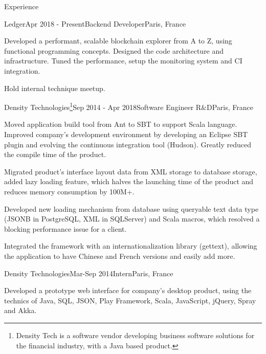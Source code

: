\documentclass{resume} %
\begin{document}

\begin{rSection}{Experience}

  \begin{rSubsection}{Ledger}{Apr 2018 - Present}{Backend Developer}{Paris, France}
  \item Developed a performant, scalable blockchain explorer from A to Z, using
    functional programming concepts. Designed the code architecture and
    infrastructure. Tuned the performance, setup the monitoring system and CI
    integration.
  \item Hold internal technique meetup.
  \end{rSubsection}

  \begin{rSubsection}{Density Technologies\footnote{Density Tech is a software
        vendor developing business software solutions for the financial industry,
        with a Java based product.}}{Sep 2014 - Apr 2018}{Software Engineer
      R\&D}{Paris, France}
  \item Moved application build tool from Ant to SBT to support Scala language.
    Improved company's development environment by developing an Eclipse SBT
    plugin and evolving the continuous integration tool (Hudson). Greatly
    reduced the compile time of the product.
  \item Migrated product's interface layout data from XML storage to database
    storage, added lazy loading feature, which halves the launching time of the
    product and reduces memory consumption by 100M+.
  \item Developed new loading mechanism from database using queryable text data
    type (JSONB in PostgreSQL, XML in SQLServer) and Scala macros, which
    resolved a blocking performance issue for a client.
  \item Integrated the framework with an internationalization library (gettext),
    allowing the application to have Chinese and French versions and easily add
    more.
  \end{rSubsection}

  \begin{rSubsection}{Density Technologies}{Mar-Sep 2014}{Intern}{Paris, France}
  \item Developed a prototype web interface for company's desktop product, using
    the technics of Java, SQL, JSON, Play Framework, Scala, JavaScript, jQuery,
    Spray and Akka.
  \end{rSubsection}

\end{rSection}
\end{document}
